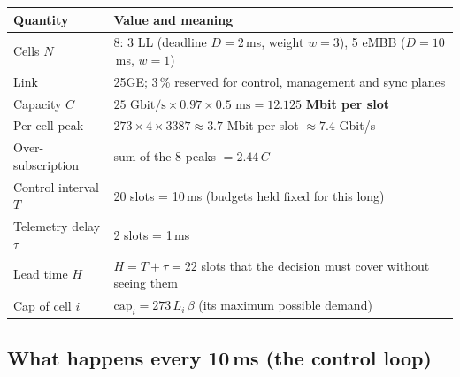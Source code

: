 \documentclass[11pt,a4paper]{article}
\begin{document}
\begin{center}
\renewcommand{\arraystretch}{1.15}
\begin{tabular}{ll}
\toprule
Quantity & Value and meaning \\
\midrule
Cells $N$ & 8: 3 LL (deadline $D = 2$\,ms, weight $w = 3$), 5 eMBB ($D = 10$\,ms, $w = 1$) \\
Link & 25GE; 3\,\% reserved for control, management and sync planes \\
Capacity $C$ & $25\text{ Gbit/s}\times 0.97\times 0.5\text{ ms} = \mathbf{12.125}$ \textbf{Mbit per slot} \\
Per-cell peak & $273 \times 4 \times 3387 \approx 3.7$ Mbit per slot $\approx 7.4$ Gbit/s \\
Over-subscription & sum of the 8 peaks $= 2.44\,C$ \\
Control interval $T$ & 20 slots = 10\,ms (budgets held fixed for this long) \\
Telemetry delay $\tau$ & 2 slots = 1\,ms \\
Lead time $H$ & $H = T + \tau = 22$ slots that the decision must cover without seeing them \\
Cap of cell $i$ & $\mathrm{cap}_i = 273\,L_i\,\beta$ (its maximum possible demand) \\
\bottomrule
\end{tabular}
\end{center}

\subsection{What happens every 10\,ms (the control loop)}
\end{document}
